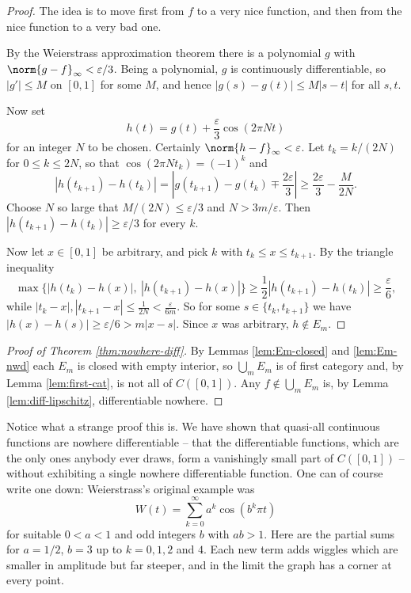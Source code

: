 \begin{proof}
	The idea is to move first from $f$ to a very nice function, and then from the nice function to a very bad one.

	By the Weierstrass approximation theorem there is a polynomial $g$ with $\norm{g-f}_\infty<\varepsilon/3$. Being a polynomial, $g$ is continuously differentiable, so $|g'|\leq M$ on $[0,1]$ for some $M$, and hence $|g(s)-g(t)|\leq M|s-t|$ for all $s,t$.

	Now set
	$$h(t) = g(t) + \frac{\varepsilon}{3}\cos(2\pi Nt)$$
	for an integer $N$ to be chosen. Certainly $\norm{h-f}_\infty<\varepsilon$. Let $t_k = k/(2N)$ for $0\leq k\leq 2N$, so that $\cos(2\pi Nt_k) = (-1)^k$ and
	$$|h(t_{k+1})-h(t_k)| = \left|g(t_{k+1})-g(t_k) \mp \frac{2\varepsilon}{3}\right| \geq \frac{2\varepsilon}{3} - \frac{M}{2N}.$$
	Choose $N$ so large that $M/(2N)\leq\varepsilon/3$ and $N > 3m/\varepsilon$. Then $|h(t_{k+1})-h(t_k)|\geq\varepsilon/3$ for every $k$.

	Now let $x\in[0,1]$ be arbitrary, and pick $k$ with $t_k\leq x\leq t_{k+1}$. By the triangle inequality
	$$\max\big\{|h(t_k)-h(x)|,\ |h(t_{k+1})-h(x)|\big\}\geq\frac12|h(t_{k+1})-h(t_k)| \geq \frac{\varepsilon}{6},$$
	while $|t_k - x|,|t_{k+1}-x|\leq\frac{1}{2N} < \frac{\varepsilon}{6m}$. So for some $s\in\{t_k,t_{k+1}\}$ we have $|h(x)-h(s)| \geq \varepsilon/6 > m|x-s|$. Since $x$ was arbitrary, $h\notin E_m$.
\end{proof}

\begin{proof}[Proof of Theorem \ref{thm:nowhere-diff}]
	By Lemmas \ref{lem:Em-closed} and \ref{lem:Em-nwd} each $E_m$ is closed with empty interior, so $\bigcup_mE_m$ is of first category and, by Lemma \ref{lem:first-cat}, is not all of $C([0,1])$. Any $f\notin\bigcup_mE_m$ is, by Lemma \ref{lem:diff-lipschitz}, differentiable nowhere.
\end{proof}

Notice what a strange proof this is. We have shown that quasi-all continuous functions are nowhere differentiable -- that the differentiable functions, which are the only ones anybody ever draws, form a vanishingly small part of $C([0,1])$ -- without exhibiting a single nowhere differentiable function. One can of course write one down: Weierstrass's original example was
$$W(t) = \sum_{k=0}^\infty a^k\cos(b^k\pi t)$$
for suitable $0<a<1$ and odd integers $b$ with $ab>1$. Here are the partial sums for $a=1/2$, $b=3$ up to $k=0,1,2$ and $4$. Each new term adds wiggles which are smaller in amplitude but far steeper, and in the limit the graph has a corner at every point.

